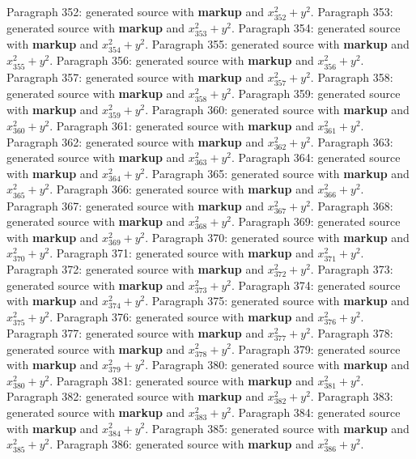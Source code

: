 \documentclass{article}
\begin{document}
Paragraph 352: generated source with \textbf{markup} and $x_{352}^2 + y^2$.
Paragraph 353: generated source with \textbf{markup} and $x_{353}^2 + y^2$.
Paragraph 354: generated source with \textbf{markup} and $x_{354}^2 + y^2$.
Paragraph 355: generated source with \textbf{markup} and $x_{355}^2 + y^2$.
Paragraph 356: generated source with \textbf{markup} and $x_{356}^2 + y^2$.
Paragraph 357: generated source with \textbf{markup} and $x_{357}^2 + y^2$.
Paragraph 358: generated source with \textbf{markup} and $x_{358}^2 + y^2$.
Paragraph 359: generated source with \textbf{markup} and $x_{359}^2 + y^2$.
Paragraph 360: generated source with \textbf{markup} and $x_{360}^2 + y^2$.
Paragraph 361: generated source with \textbf{markup} and $x_{361}^2 + y^2$.
Paragraph 362: generated source with \textbf{markup} and $x_{362}^2 + y^2$.
Paragraph 363: generated source with \textbf{markup} and $x_{363}^2 + y^2$.
Paragraph 364: generated source with \textbf{markup} and $x_{364}^2 + y^2$.
Paragraph 365: generated source with \textbf{markup} and $x_{365}^2 + y^2$.
Paragraph 366: generated source with \textbf{markup} and $x_{366}^2 + y^2$.
Paragraph 367: generated source with \textbf{markup} and $x_{367}^2 + y^2$.
Paragraph 368: generated source with \textbf{markup} and $x_{368}^2 + y^2$.
Paragraph 369: generated source with \textbf{markup} and $x_{369}^2 + y^2$.
Paragraph 370: generated source with \textbf{markup} and $x_{370}^2 + y^2$.
Paragraph 371: generated source with \textbf{markup} and $x_{371}^2 + y^2$.
Paragraph 372: generated source with \textbf{markup} and $x_{372}^2 + y^2$.
Paragraph 373: generated source with \textbf{markup} and $x_{373}^2 + y^2$.
Paragraph 374: generated source with \textbf{markup} and $x_{374}^2 + y^2$.
Paragraph 375: generated source with \textbf{markup} and $x_{375}^2 + y^2$.
Paragraph 376: generated source with \textbf{markup} and $x_{376}^2 + y^2$.
Paragraph 377: generated source with \textbf{markup} and $x_{377}^2 + y^2$.
Paragraph 378: generated source with \textbf{markup} and $x_{378}^2 + y^2$.
Paragraph 379: generated source with \textbf{markup} and $x_{379}^2 + y^2$.
Paragraph 380: generated source with \textbf{markup} and $x_{380}^2 + y^2$.
Paragraph 381: generated source with \textbf{markup} and $x_{381}^2 + y^2$.
Paragraph 382: generated source with \textbf{markup} and $x_{382}^2 + y^2$.
Paragraph 383: generated source with \textbf{markup} and $x_{383}^2 + y^2$.
Paragraph 384: generated source with \textbf{markup} and $x_{384}^2 + y^2$.
Paragraph 385: generated source with \textbf{markup} and $x_{385}^2 + y^2$.
Paragraph 386: generated source with \textbf{markup} and $x_{386}^2 + y^2$.
\end{document}
